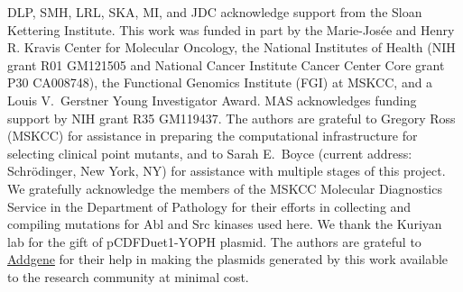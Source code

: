 \documentclass[phd,tocprelim]{cornell}
\begin{document}
DLP, SMH, LRL, SKA, MI, and JDC acknowledge support from the Sloan Kettering Institute.
This work was funded in part by the Marie-Josée and Henry R. Kravis Center for Molecular Oncology, the National Institutes of Health (NIH grant R01 GM121505 and National Cancer Institute Cancer Center Core grant P30 CA008748), the Functional Genomics Institute (FGI) at MSKCC, and a Louis V.~Gerstner Young Investigator Award. 
MAS acknowledges funding support by NIH grant R35 GM119437. 
The authors are grateful to Gregory Ross (MSKCC) for assistance in preparing the computational infrastructure for selecting clinical point mutants, and to Sarah E.~Boyce (current address: Schr\"{o}dinger, New York, NY) for assistance with multiple stages of this project.
We gratefully acknowledge the members of the MSKCC Molecular Diagnostics Service in the Department of Pathology for their efforts in collecting and compiling mutations for Abl and Src kinases used here.
We thank the Kuriyan lab for the gift of pCDFDuet1-YOPH plasmid.
The authors are grateful to \href{http://www.addgene.org}{Addgene} for their help in making the plasmids generated by this work available to the research community at minimal cost.

\realsinglespacing


\end{document}
